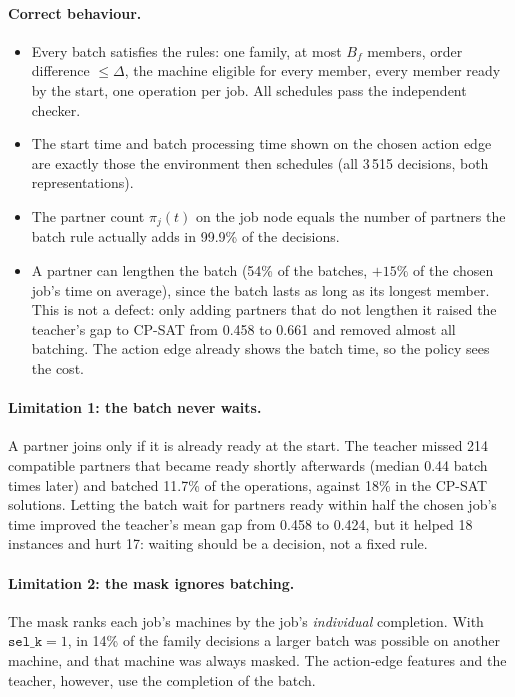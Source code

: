 \documentclass[11pt,a4paper]{article}
\begin{document}
\paragraph{Correct behaviour.}
\begin{itemize}
  \item Every batch satisfies the rules: one family, at most $B_f$ members,
    order difference $\le\Delta$, the machine eligible for every member, every member
    ready by the start, one operation per job. All schedules pass the independent checker.
  \item The start time and batch processing time shown on the chosen action edge are
    exactly those the environment then schedules (all 3\,515 decisions, both
    representations).
  \item The partner count $\pi_j(t)$ on the job node equals the number of partners the
    batch rule actually adds in 99.9\% of the decisions.
  \item A partner can lengthen the batch (54\% of the batches, $+15\%$ of the chosen
    job's time on average), since the batch lasts as long as its longest member. This is
    not a defect: only adding partners that do not lengthen it raised the teacher's gap
    to CP-SAT from 0.458 to 0.661 and removed almost all batching. The action edge already
    shows the batch time, so the policy sees the cost.
\end{itemize}

\paragraph{Limitation 1: the batch never waits.}
A partner joins only if it is already ready at the start. The teacher missed 214 compatible
partners that became ready shortly afterwards (median 0.44 batch times later) and batched
11.7\% of the operations, against 18\% in the CP-SAT solutions. Letting the batch wait for
partners ready within half the chosen job's time improved the teacher's mean gap from
0.458 to 0.424, but it helped 18 instances and hurt 17: waiting should be a decision, not
a fixed rule.

\paragraph{Limitation 2: the mask ignores batching.}
The mask ranks each job's machines by the job's \emph{individual} completion. With
$\texttt{sel\_k}=1$, in 14\% of the family decisions a larger batch was possible on
another machine, and that machine was always masked. The action-edge features and the
teacher, however, use the completion of the batch.
\end{document}
